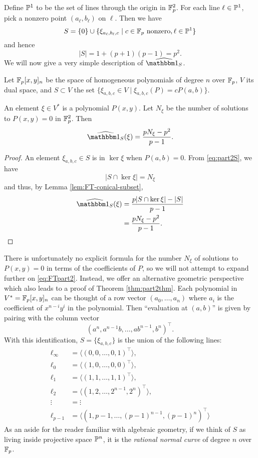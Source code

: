 Define $\P^1$ to be the set of lines through the origin in $\F_p^2$. For each line $\ell \in \P^1$, pick a nonzero point $(a_\ell,b_\ell)$ on $\ell$. Then we have
\begin{equation}\label{eq:part2S}
	S = \{0\} \cup \{\xi_{a_\ell,b_\ell,c} \mid c\in \F_p \text{ nonzero}, \ell \in \P^1 \}
\end{equation}
and hence
\[
	|S| = 1 + (p+1)(p-1) = p^2.
\]
We will now give a very simple description of $\widehat{\IND_S}$.
\begin{thm}\label{thm:part2thm}
	Let $\F_p[x,y]_n$ be the space of homogeneous polynomials of degree $n$ over $\F_p$, $V$ its dual space, and $S\subset V$ the set $\{\xi_{a,b,c} \in V \mid \xi_{a,b,c}(P) = cP(a,b)\}$.
	
	An element $\xi \in V^*$ is a polynomial $P(x,y)$. Let $N_\xi$ be the number of solutions to $P(x,y)=0$ in $\F_p^2$. Then
	\begin{equation}
		\widehat{\IND_S}(\xi) = \frac{pN_\xi - p^2}{p-1}.\label{eq:FTpart2}
	\end{equation}
\end{thm}
\begin{proof}
	An element $\xi_{a,b,c}\in S$ is in $\ker \xi$ when $P(a,b) = 0$. From \eqref{eq:part2S}, we have
	\[
		|S \cap \ker \xi| = N_\xi
	\]
	and thus, by Lemma \ref{lem:FT-conical-subset},
	\begin{align*}
		\widehat{\IND_S}(\xi) &= \frac{p|S\cap \ker \xi| - |S|}{p-1}\\
		&= \frac{pN_\xi - p^2}{p-1}.\qedhere
	\end{align*}
\end{proof}
There is unfortunately no explicit formula for the number $N_\xi$ of solutions to $P(x,y) = 0$ in terms of the coefficients of $P$, so we will not attempt to expand further on \eqref{eq:FTpart2}. Instead, we offer an alternative geometric perspective which also leads to a proof of Theorem \ref{thm:part2thm}. Each polynomial in $V^* = \F_p[x,y]_n$ can be thought of a row vector $(a_0,\ldots,a_n)$ where $a_i$ is the coefficient of $x^{n-i}y^i$ in the polynomial. Then ``evaluation at $(a,b)$'' is given by pairing with the column vector
\[
	(a^n,a^{n-1}b,\ldots,ab^{n-1},b^n)^\top.
\]
With this identification, $S = \{\xi_{a,b,c}\}$ is the union of the following lines:
\begin{align*}
	\ell_\infty &= \langle (0,0,\ldots,0,1)^\top \rangle,\\
	\ell_0 &= \langle (1,0,\ldots,0,0)^\top \rangle,\\
	\ell_1 &= \langle (1,1,\ldots,1,1)^\top \rangle,\\
	\ell_2 &= \langle (1,2,\ldots,2^{n-1},2^n)^\top \rangle,\\
	\vdots &= \vdots\\
	\ell_{p-1} &= \langle (1,p-1,\ldots,(p-1)^{n-1},(p-1)^n)^\top \rangle
\end{align*}
As an aside for the reader familiar with algebraic geometry, if we think of $S$ as living inside projective space $\P^{n}$, it is the \emph{rational normal curve} of degree $n$ over $\F_p$.

